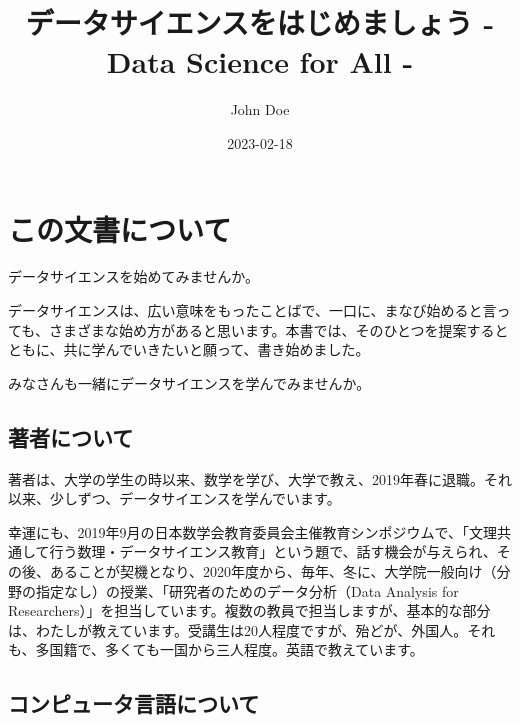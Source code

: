 \documentclass[
]{bxjsbook}
\title{データサイエンスをはじめましょう - Data Science for All -}
\author{John Doe}
\date{2023-02-18}
\theoremstyle{definition}
\theoremstyle{definition}
\theoremstyle{definition}
\theoremstyle{definition}
\theoremstyle{remark}
\begin{document}
\maketitle

{
\setcounter{tocdepth}{2}
\tableofcontents
}
\hypertarget{ux3053ux306eux6587ux66f8ux306bux3064ux3044ux3066}{%
\section*{この文書について}\label{ux3053ux306eux6587ux66f8ux306bux3064ux3044ux3066}}

データサイエンスを始めてみませんか。

データサイエンスは、広い意味をもったことばで、一口に、まなび始めると言っても、さまざまな始め方があると思います。本書では、そのひとつを提案するとともに、共に学んでいきたいと願って、書き始めました。

みなさんも一緒にデータサイエンスを学んでみませんか。

\hypertarget{ux8457ux8005ux306bux3064ux3044ux3066}{%
\subsection*{著者について}\label{ux8457ux8005ux306bux3064ux3044ux3066}}

著者は、大学の学生の時以来、数学を学び、大学で教え、2019年春に退職。それ以来、少しずつ、データサイエンスを学んでいます。

幸運にも、2019年9月の日本数学会教育委員会主催教育シンポジウムで、「文理共通して行う数理・データサイエンス教育」という題で、話す機会が与えられ、その後、あることが契機となり、2020年度から、毎年、冬に、大学院一般向け（分野の指定なし）の授業、「研究者のためのデータ分析（Data Analysis for Researchers）」を担当しています。複数の教員で担当しますが、基本的な部分は、わたしが教えています。受講生は20人程度ですが、殆どが、外国人。それも、多国籍で、多くても一国から三人程度。英語で教えています。

\hypertarget{ux30b3ux30f3ux30d4ux30e5ux30fcux30bfux8a00ux8a9eux306bux3064ux3044ux3066}{%
\subsection*{コンピュータ言語について}\label{ux30b3ux30f3ux30d4ux30e5ux30fcux30bfux8a00ux8a9eux306bux3064ux3044ux3066}}
\end{document}
